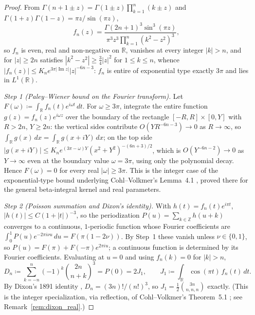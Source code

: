 \documentclass[11pt,a4paper]{article}
\theoremstyle{plain}
\theoremstyle{definition}
\theoremstyle{remark}
\numberwithin{equation}{section}
\begin{document}
\begin{proof}
From $\Gamma(n+1\pm z) = \Gamma(1\pm z)\prod_{k=1}^n(k\pm z)$ and $\Gamma(1+z)\Gamma(1-z) = \pi z/\sin(\pi z)$,
\[
f_n(z) = \frac{\Gamma(2n+1)^3\sin^3(\pi z)}{\pi^3 z^3\prod_{k=1}^n(k^2-z^2)^3},
\]
so $f_n$ is even, real and non-negative on $\mathbb{R}$, vanishes at every integer $|k|>n$, and for $|z|\ge 2n$ satisfies $|k^2-z^2|\ge\frac34|z|^2$ for $1\le k\le n$, whence $|f_n(z)|\le K_n e^{3\pi|\operatorname{Im}z|}|z|^{-6n-3}$: $f_n$ is entire of exponential type exactly $3\pi$ and lies in $L^1(\mathbb{R})$.

\emph{Step 1 (Paley--Wiener bound on the Fourier transform).} Let $F(\omega) \coloneqq \int_{\mathbb{R}} f_n(t) e^{i\omega t}\,dt$. For $\omega\ge3\pi$, integrate the entire function $g(z)=f_n(z)e^{i\omega z}$ over the boundary of the rectangle $[-R,R]\times[0,Y]$ with $R>2n$, $Y\ge2n$: the vertical sides contribute $O(YR^{-6n-3})\to0$ as $R\to\infty$, so $\int_\mathbb{R}g(x)\,dx=\int_\mathbb{R}g(x+iY)\,dx$; on the top side $|g(x+iY)|\le K_n e^{(3\pi-\omega)Y}(x^2+Y^2)^{-(6n+3)/2}$, which is $O(Y^{-6n-2})\to0$ as $Y\to\infty$ even at the boundary value $\omega=3\pi$, using only the polynomial decay. Hence $F(\omega)=0$ for every real $|\omega|\ge3\pi$. This is the integer case of the exponential-type bound underlying Cohl--Volkmer's Lemma~4.1 \cite{cohlvolkmer2025}, proved there for the general beta-integral kernel and real parameters.

\emph{Step 2 (Poisson summation and Dixon's identity).} With $h(t) = f_n(t)e^{i\pi t}$, $|h(t)|\le C(1+|t|)^{-3}$, so the periodization $P(u) = \sum_{k\in\mathbb{Z}} h(u+k)$ converges to a continuous, $1$-periodic function whose Fourier coefficients are $\int_0^1P(u)e^{-2\pi i\nu u}\,du = F(\pi(1-2\nu))$. By Step~1 these vanish unless $\nu\in\{0,1\}$, so $P(u)=F(\pi)+F(-\pi)e^{2\pi iu}$; a continuous function is determined by its Fourier coefficients. Evaluating at $u=0$ and using $f_n(k)=0$ for $|k|>n$,
\[
D_n \coloneqq \sum_{k=-n}^n (-1)^k \binom{2n}{n+k}^3 = P(0) = 2J_1, \qquad J_1 \coloneqq \int_{\mathbb{R}}\cos(\pi t)\, f_n(t)\,dt.
\]
By Dixon's 1891 identity \cite{dixon1891}, $D_n = (3n)!/(n!)^3$, so $J_1=\frac12\binom{3n}{n,n,n}$ exactly. (This is the integer specialization, via reflection, of Cohl--Volkmer's Theorem~5.1 \cite{cohlvolkmer2025}; see Remark~\ref{rem:dixon_real}.)


\end{proof}
\end{document}
